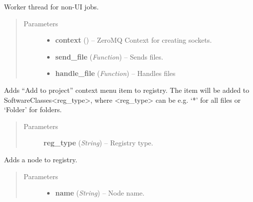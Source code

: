 \documentclass[letterpaper,10pt,english]{sphinxmanual}
\begin{document}
\begin{fulllineitems}
\label{wos:wos.WORKER_THREAD}
Worker thread for non-UI jobs.
\begin{quote}\begin{description}
\item[{Parameters}] \leavevmode\begin{itemize}
\item {} 
\textbf{context} () -- ZeroMQ Context for creating sockets.

\item {} 
\textbf{send\_file} (\emph{Function}) -- Sends files.

\item {} 
\textbf{handle\_file} (\emph{Function}) -- Handles files

\end{itemize}

\end{description}\end{quote}

\begin{fulllineitems}
\label{wos:wos.WORKER_THREAD.AddProjectReg}
Adds ``Add to project'' context menu item to registry. The item
will be added to SoftwareClasses\textless{}reg\_type\textgreater{}, where \textless{}reg\_type\textgreater{}
can be e.g. `*' for all files or `Folder' for folders.
\begin{quote}\begin{description}
\item[{Parameters}] \leavevmode
\textbf{reg\_type} (\emph{String}) -- Registry type.

\end{description}\end{quote}

\end{fulllineitems}


\begin{fulllineitems}
\label{wos:wos.WORKER_THREAD.AddRegEntry}
Adds a node to registry.
\begin{quote}\begin{description}
\item[{Parameters}] \leavevmode\begin{itemize}
\item {} 
\textbf{name} (\emph{String}) -- Node name.


\end{itemize}
\end{description}
\end{quote}
\end{fulllineitems}
\end{fulllineitems}
\end{document}
